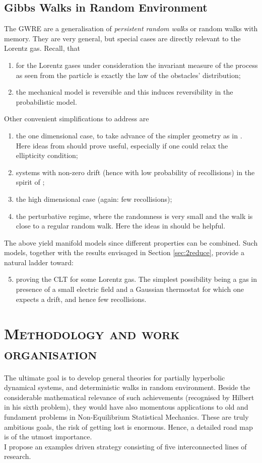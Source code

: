 \documentclass[10pt, a4paper, reqno]{amsart}
\begin{document}
\subsection{Gibbs Walks in Random Environment}\label{sec:2random}
The GWRE are a generalisation of {\em persistent random walks} or random walks with memory.
They are very general, but special cases are directly relevant to the Lorentz gas. Recall, that 
\begin{enumerate}
\item for the  Lorentz gases under consideration the invariant measure of the process as seen from the particle is exactly the law of the obstacles' distribution;
\item the mechanical model is reversible and this induces reversibility in the probabilistic model.
\end{enumerate}
Other convenient simplifications to address are
\begin{enumerate}
\item the one dimensional case, to take advance of the simpler geometry as in \cite{CLS0}. Here ideas from \cite{DG13} should prove useful, especially if one could relax the ellipticity condition;
\item systems with non-zero drift (hence with low probability of recollisions) in the spirit of \cite{DK20};
\item the  high dimensional case (again: few recollisions);
\item the perturbative regime, where the randomness is very small and the walk is close to a regular random walk. Here the ideas in \cite{BK91,SZ06} should be helpful.
\end{enumerate}

The above yield manifold models since different properties can be combined. Such models, together with the results envisaged in Section \ref{sec:2reduce}, provide a natural ladder toward:
\begin{enumerate}
\setcounter{enumi}{4}
\item proving the CLT for some Lorentz gas. The simplest possibility being a gas in presence of a small electric field and a Gaussian thermostat for which one expects a drift, and hence few recollisions.
\end{enumerate}

\section{\textbf{\textsc{Methodology and work organisation}}}
The ultimate goal is to develop general theories for partially hyperbolic dynamical systems, and deterministic walks in random environment. Beside the considerable mathematical relevance of such achievements (recognised by Hilbert in his sixth problem), they would have also momentous applications to old and fundament problems in Non-Equilibrium Statistical Mechanics. These are truly ambitious goals, the risk of getting lost is enormous. Hence, a detailed road map is of the utmost importance.\\
I propose an examples driven strategy consisting of five interconnected lines of research. 
\end{document}
